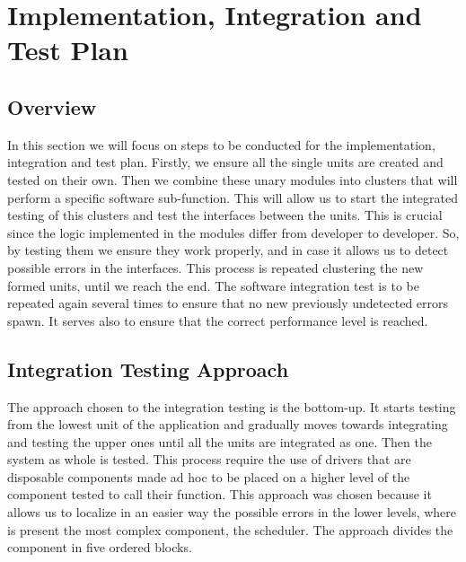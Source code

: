 \chapter{Implementation, Integration and Test Plan}
\section{Overview}
In this section we will focus on steps to be conducted for the implementation, integration and test plan. 
Firstly, we ensure all the single units are created and tested on their own. Then we combine these unary modules into clusters that will perform a specific software sub-function. This will allow us to start the integrated testing of this clusters and test the interfaces between the units. This is crucial since the logic implemented in the modules differ from developer to developer. So, by testing them we ensure they work properly, and in case it allows us to detect possible errors in the interfaces. This process is repeated clustering the new formed units, until we reach the end.
The software integration test is to be repeated again several times to ensure that no new previously undetected errors spawn. It serves also to ensure that the correct performance level is reached.

\section{Integration Testing Approach}
The approach chosen to the integration testing is the bottom-up. It starts testing from the lowest unit of the application and gradually moves towards integrating and testing the upper ones until all the units are integrated as one. Then the system as whole is tested. This process require the use of drivers that are disposable components made ad hoc to be placed on a higher level of the component tested to call their function. 
This approach was chosen because it allows us to localize in an easier way the possible errors in the lower levels, where is present the most complex component, the scheduler. The approach divides the component in five ordered blocks.\\

